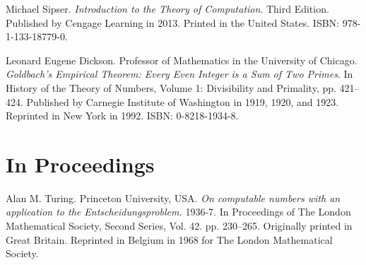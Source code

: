 \begin{thebibliography}{9}
\backrefprint


Michael Sipser. \emph{Introduction to the Theory of Computation}. Third
Edition. Published by Cengage Learning in 2013. Printed in the United States.
ISBN: 978-1-133-18779-0.

\backrefprint




Leonard Eugene Dickson. Professor of Mathematics in the University of Chicago.
\emph{Goldbach's Empirical Theorem: Every Even Integer is a Sum of Two Primes}.
In History of the Theory of Numbers, Volume 1: Divisibility and Primality, pp.
421--424.  Published by Carnegie Institute of Washington in 1919, 1920, and
1923.  Reprinted in New York in 1992. ISBN: 0-8218-1934-8.

\backrefprint

\section*{In Proceedings}


Alan M. Turing. Princeton University, USA. \emph{On computable numbers with an
application to the Entscheidungsproblem.} 1936-7. In Proceedings of The London
Mathematical Society, Second Series, Vol. 42. pp. 230–265. Originally printed
in Great Britain. Reprinted in Belgium in 1968 for The London Mathematical
Society.

\backrefprint







\end{thebibliography}
